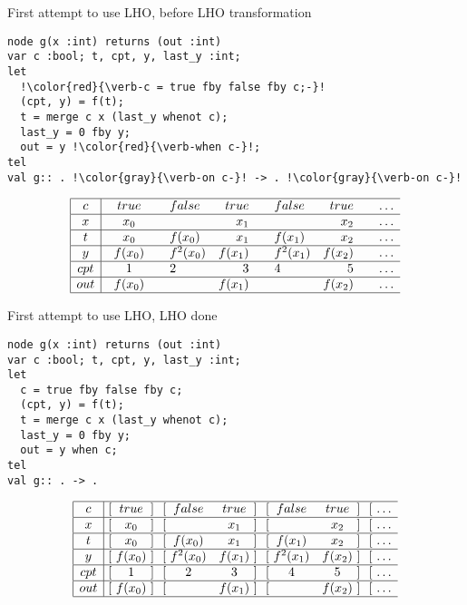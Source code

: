 \documentclass[xcolor=dvipsnames]{beamer}
\def\li{\\ \hline}
\begin{document}
\begin{frame}[fragile]{First attempt to use LHO, before LHO transformation}
\begin{lstlisting}[escapechar=!]
node g(x :int) returns (out :int)
var c :bool; t, cpt, y, last_y :int;
let
  !\color{red}{\verb-c = true fby false fby c;-}!
  (cpt, y) = f(t);
  t = merge c x (last_y whenot c);
  last_y = 0 fby y;
  out = y !\color{red}{\verb-when c-}!;
tel
val g:: . !\color{gray}{\verb-on c-}! -> . !\color{gray}{\verb-on c-}!
\end{lstlisting}
\[
\begin{array}{|c|@{\ \ \ }c@{\ \ \ }@{\ \ \ }lr@{\ \ \ }@{\ \ \ }lr@{\ \ \ }@{\ \ \ }lr} \hline
c & true & false & true & false & true & \ldots\li
x & x_0 & & x_1 & & x_2 &\ldots\li
t & x_0 & f(x_0) & x_1 & f(x_1) & x_2 &\ldots\li
y & f(x_0) & f^2(x_0) & f(x_1) & f^2(x_1) & f(x_2) &\ldots\li
cpt & 1 & 2 & 3 & 4 & 5 &\ldots\li
out & f(x_0) & & f(x_1) & & f(x_2) &\ldots \li
\end{array}
\]
\end{frame}
\begin{frame}[fragile]{First attempt to use LHO, LHO done}
\begin{lstlisting}[escapechar=!]
node g(x :int) returns (out :int)
var c :bool; t, cpt, y, last_y :int;
let
  c = true fby false fby c;
  (cpt, y) = f(t);
  t = merge c x (last_y whenot c);
  last_y = 0 fby y;
  out = y when c;
tel
val g:: . -> .
\end{lstlisting}
\[
\begin{array}{|c|@{\ [\ }c@{\ ]\ }@{\ [\ }cc@{\ ]\ }@{\ [\ }cc@{\ ]\ }@{\ [\ }lr} \hline
c & true & false & true & false & true & \ldots\li
x & x_0 & & x_1 & & x_2 &\ldots\li
t & x_0 & f(x_0) & x_1 & f(x_1) & x_2 &\ldots\li
y & f(x_0) & f^2(x_0) & f(x_1) & f^2(x_1) & f(x_2) &\ldots\li
cpt & 1 & 2 & 3 & 4 & 5 &\ldots\li
out & f(x_0) & & f(x_1) & & f(x_2) &\ldots \li
\end{array}
\]
\end{frame}
\end{document}
